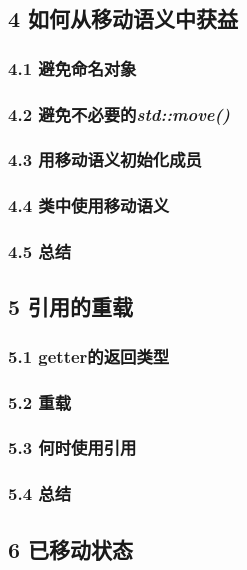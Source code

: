 \documentclass[11pt,a4paper,UTF8]{ctexart}
\begin{document}
	\subsection{4 如何从移动语义中获益}
	
		\subsubsection{4.1 避免命名对象}
		
		\subsubsection{4.2 避免不必要的\textit{std::move()}}
		
		\subsubsection{4.3 用移动语义初始化成员}
		
		\subsubsection{4.4 类中使用移动语义}
		
		\subsubsection{4.5 总结}
		
	\subsection{5 引用的重载}
	
		\subsubsection{5.1 getter的返回类型}
		
		\subsubsection{5.2 重载}
		
		\subsubsection{5.3 何时使用引用}
		
		\subsubsection{5.4 总结}
		
	\subsection{6 已移动状态}
	
\end{document}
